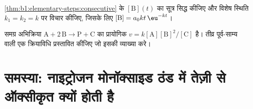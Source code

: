 \begin{exercise}[$\star\star\star$]\label{exo:b1:elementary-steps:11}
\cref{thm:b1:elementary-steps:consecutive} के $[\mathrm{B}](t)$ का सूत्र सिद्ध
कीजिए और विशेष स्थिति $k_1 = k_2 = k$ पर विचार कीजिए, जिसके लिए
$[\mathrm{B}] = a_0kt\,\eu^{-kt}$।
\end{exercise}

\begin{exercise}[$\star\star\star$]\label{exo:b1:elementary-steps:12}
समग्र अभिक्रिया $\mathrm{A} + 2\,\mathrm{B} \to \mathrm{P} +
\mathrm{C}$ का प्रायोगिक  $v =
k[\mathrm{A}][\mathrm{B}]^2/[\mathrm{C}]$ है। तीव्र पूर्व-साम्य वाली एक क्रियाविधि
प्रस्तावित कीजिए जो इसकी व्याख्या करे।
\end{exercise}

\section{समस्या: नाइट्रोजन मोनॉक्साइड ठंड में तेज़ी से ऑक्सीकृत क्यों होती है}

